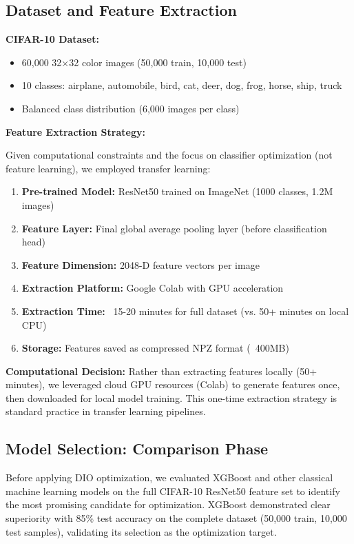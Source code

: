 \documentclass[12pt, a4paper]{article}
\begin{document}
\subsection{Dataset and Feature Extraction}

\textbf{CIFAR-10 Dataset:}
\begin{itemize}
    \item 60,000 32×32 color images (50,000 train, 10,000 test)
    \item 10 classes: airplane, automobile, bird, cat, deer, dog, frog, horse, ship, truck
    \item Balanced class distribution (6,000 images per class)
\end{itemize}

\textbf{Feature Extraction Strategy:}

Given computational constraints and the focus on classifier optimization (not feature learning), we employed transfer learning:

\begin{enumerate}
    \item \textbf{Pre-trained Model:} ResNet50 trained on ImageNet (1000 classes, 1.2M images)
    \item \textbf{Feature Layer:} Final global average pooling layer (before classification head)
    \item \textbf{Feature Dimension:} 2048-D feature vectors per image
    \item \textbf{Extraction Platform:} Google Colab with GPU acceleration
    \item \textbf{Extraction Time:} ~15-20 minutes for full dataset (vs. 50+ minutes on local CPU)
    \item \textbf{Storage:} Features saved as compressed NPZ format (~400MB)
\end{enumerate}

\textbf{Computational Decision:} Rather than extracting features locally (50+ minutes), we leveraged cloud GPU resources (Colab) to generate features once, then downloaded for local model training. This one-time extraction strategy is standard practice in transfer learning pipelines.

\subsection{Model Selection: Comparison Phase}

Before applying DIO optimization, we evaluated XGBoost and other classical machine learning models on the full CIFAR-10 ResNet50 feature set to identify the most promising candidate for optimization. XGBoost demonstrated clear superiority with 85\% test accuracy on the complete dataset (50,000 train, 10,000 test samples), validating its selection as the optimization target.
\end{document}

